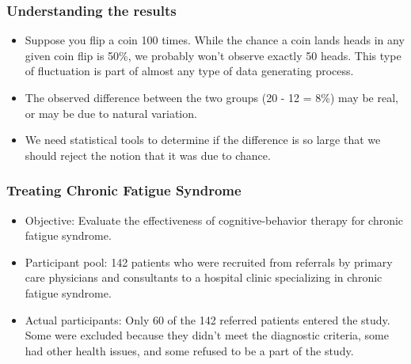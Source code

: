 \begin{frame}
\frametitle{Understanding the results}


\pause

\begin{itemize}

\item Suppose you flip a coin 100 times. While the chance a coin lands heads in any given coin flip is 50\%, we probably won't observe exactly 50 heads. This type of fluctuation is part of almost any type of data generating process.

\item The observed difference between the two groups (20 - 12 = 8\%) may be real, or may be due to natural variation.

\item We need statistical tools to determine if the difference is so large that we should reject the notion that it was due to chance.

\end{itemize}

\end{frame}




\begin{frame}
\frametitle{Treating Chronic Fatigue Syndrome}

\begin{itemize}

\item Objective: Evaluate the effectiveness of cognitive-behavior therapy for chronic fatigue syndrome.

\item Participant pool: 142 patients who were recruited from referrals by primary care physicians and consultants to a hospital clinic specializing in chronic fatigue syndrome.

\item Actual participants: Only 60 of the 142 referred patients entered the study. Some were excluded because they didn't meet the diagnostic criteria, some had other health issues, and some refused to be a part of the study.

\end{itemize}


\end{frame}

